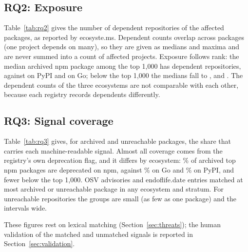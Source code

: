 \documentclass[11pt,a4paper]{article}
\begin{document}
\subsection{RQ2: Exposure}

Table~\ref{tab:rq2} gives the number of dependent repositories of the
affected packages, as reported by ecosyste.ms. Dependent counts overlap
across packages (one project depends on many), so they are given as
medians and maxima and are never summed into a count of affected
projects. Exposure follows rank: the median archived npm package among
the top 1,000 has  dependent
repositories, against  on PyPI and
 on Go; below the top 1,000 the medians
fall to ,
 and
. The dependent counts of the three
ecosystems are not comparable with each other, because each registry
records dependents differently.

\begin{table}[t]
\centering\small
\caption{RQ2. Dependent repositories of affected packages: number of
packages ($n$), median and (archived only) maximum. Counts overlap across
packages and are not summed.}
\label{tab:rq2}
\resizebox{\linewidth}{!}{\tableRQtwo}
\end{table}

\subsection{RQ3: Signal coverage}

Table~\ref{tab:rq3} gives, for archived and unreachable packages, the
share that carries each machine-readable signal. Almost all coverage
comes from the registry's own deprecation flag, and it differs by
ecosystem: \% of archived top npm
packages are deprecated on npm, against \%
on Go and \% on PyPI, and fewer below the
top 1,000. OSV advisories and endoflife.date entries matched at most
 archived or unreachable package in any ecosystem
and stratum. For unreachable repositories the groups are small (as few as
one package) and the intervals wide.

These figures rest on lexical matching (Section~\ref{sec:threats}); the
human validation of the matched and unmatched signals is reported in
Section~\ref{sec:validation}.
\end{document}
